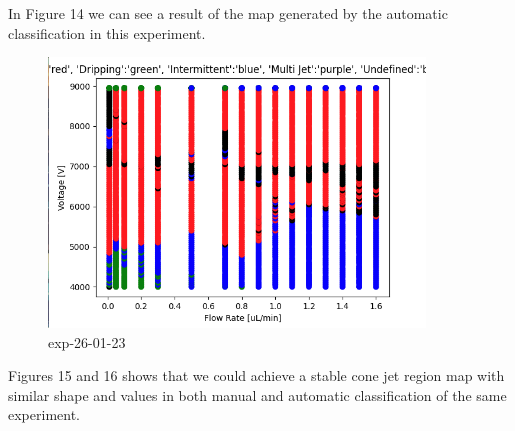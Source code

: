         In Figure 14 we can see a result of the map generated by the automatic classification in this experiment.

        \begin{figure}[H]
            \center
            \includegraphics[width=10cm]{Figuras/report3/map-exp-26-01.png}
            \caption{ exp-26-01-23 }
        \end{figure}

        Figures 15 and 16 shows that we could achieve a stable cone jet region map with similar shape and values in both manual and automatic classification of the same experiment.

